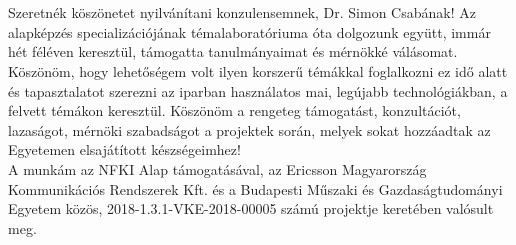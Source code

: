 \chapter*{\koszonetnyilvanitas}

Szeretnék köszönetet nyilvánítani konzulensemnek, Dr. Simon Csabának! Az alapképzés specializációjának témalaboratóriuma óta dolgozunk együtt, immár hét féléven keresztül, támogatta tanulmányaimat és mérnökké válásomat. Köszönöm, hogy lehetőségem volt ilyen korszerű témákkal foglalkozni ez idő alatt és tapasztalatot szerezni az iparban használatos mai, legújabb technológiákban, a felvett témákon keresztül. Köszönöm a rengeteg támogatást, konzultációt, lazaságot, mérnöki szabadságot a projektek során, melyek sokat hozzáadtak az Egyetemen elsajátított készségeimhez! \\

\noindent
A munkám az NFKI Alap támogatásával, az Ericsson Magyarország Kommunikációs Rendszerek Kft. és a Budapesti Műszaki és Gazdaságtudományi Egyetem közös, 2018-1.3.1-VKE-2018-00005 számú projektje keretében valósult meg.